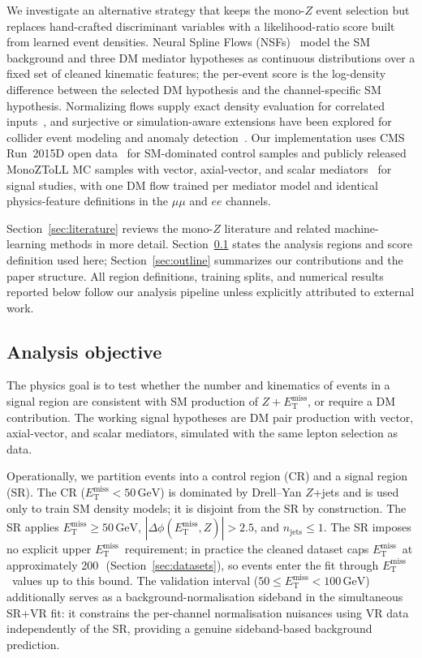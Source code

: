 \documentclass[11pt,a4paper,twocolumn]{article}
\newcommand{\GeV}{\text{GeV}}
\newcommand{\MET}{\ensuremath{E_{\mathrm{T}}^{\mathrm{miss}}}}
\begin{document}
We investigate an alternative strategy that keeps the mono-$Z$ event selection but replaces
hand-crafted discriminant variables with a likelihood-ratio score built from learned event
densities.
Neural Spline Flows (NSFs)~\cite{Durkan2019,Papamakarios2021} model the SM background and
three DM mediator hypotheses as continuous distributions over a fixed set of cleaned
kinematic features; the per-event score is the log-density difference between the selected
DM hypothesis and the channel-specific SM hypothesis.
Normalizing flows supply exact density evaluation for correlated inputs~\cite{Papamakarios2021,Reyes2022},
and surjective or simulation-aware extensions have been explored for collider event
modeling and anomaly detection~\cite{Verheyen2022,Andreassen2020}.
Our implementation uses CMS Run~2015D open data~\cite{CERNOpenDataDoubleMuon,CERNOpenDataDoubleEG}
for SM-dominated control samples and publicly released MonoZToLL MC samples with
vector, axial-vector, and scalar mediators~\cite{CERNOpenDataMonoZVector,CERNOpenDataMonoZAxialMx10Mv20,CERNOpenDataMonoZAxialMx50Mv200,CERNOpenDataMonoZScalar}
for signal studies, with one DM flow trained per mediator model and identical
physics-feature definitions in the $\mu\mu$ and $ee$ channels.

Section~\ref{sec:literature} reviews the mono-$Z$ literature and related machine-learning
methods in more detail.
Section~\ref{sec:objective} states the analysis regions and score definition used here;
Section~\ref{sec:outline} summarizes our contributions and the paper structure.
All region definitions, training splits, and numerical results reported below follow our
analysis pipeline unless explicitly attributed to external work.

\subsection{Analysis objective}
\label{sec:objective}

The physics goal is to test whether the number and kinematics of events in a signal region
are consistent with SM production of $Z+\MET$, or require a DM contribution.
The working signal hypotheses are DM pair production with vector, axial-vector, and
scalar mediators, simulated with the same lepton selection as data.

Operationally, we partition events into a control region (CR) and a signal region (SR).
The CR ($\MET<50\,\GeV$) is dominated by Drell--Yan $Z$+jets and is used only to train
SM density models; it is disjoint from the SR by construction.
The SR applies $\MET\ge 50\,\GeV$, $|\Delta\phi(\MET,Z)|>2.5$, and $n_{\mathrm{jets}}\le 1$.
The SR imposes no explicit upper \MET\ requirement; in practice the
cleaned dataset caps \MET\ at approximately 200\,\GeV\
(Section~\ref{sec:datasets}), so events enter the fit through \MET\
values up to this bound. The validation interval ($50\le\MET<100\,\GeV$) additionally serves as a
background-normalisation sideband in the simultaneous SR+VR fit: it constrains the per-channel normalisation nuisances using VR data independently of the SR, providing a genuine sideband-based background prediction.
\end{document}

